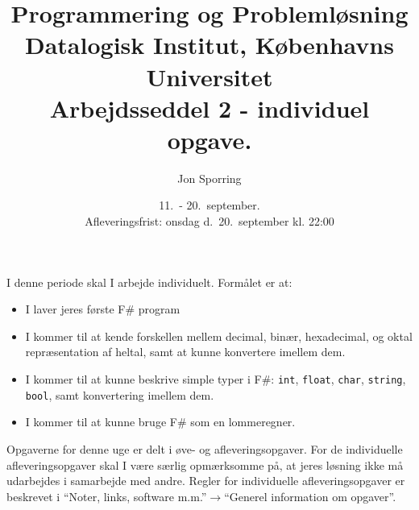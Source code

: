 \documentclass[a4paper,12pt]{article}
\title{Programmering og Problemløsning\\Datalogisk Institut,
  Københavns Universitet\\Arbejdsseddel 2 - individuel opgave.}
\author{Jon Sporring}
\date{11.\ - 20.\ september.\\Afleveringsfrist: onsdag d.\ 20.\ september kl. 22:00}
\begin{document}
\maketitle

I denne periode skal I arbejde individuelt. Formålet er at:
\begin{itemize}
\item I laver jeres første F\# program
\item I kommer til at kende forskellen mellem decimal, binær, hexadecimal, og oktal repræsentation af heltal, samt at kunne konvertere imellem dem.
\item I kommer til at kunne beskrive simple typer i F\#: \lstinline{int}, \lstinline{float}, \lstinline{char}, \lstinline{string}, \lstinline{bool}, samt konvertering imellem dem.
\item I kommer til at kunne bruge F\# som en lommeregner.
\end{itemize}

Opgaverne for denne uge er delt i øve- og afleveringsopgaver. For de individuelle afleveringsopgaver skal I være særlig opmærksomme på, at jeres løsning ikke må udarbejdes i samarbejde med andre. Regler for individuelle afleveringsopgaver er beskrevet i "`Noter, links, software m.m."'$\rightarrow$"`Generel information om opgaver"'.
\end{document}
